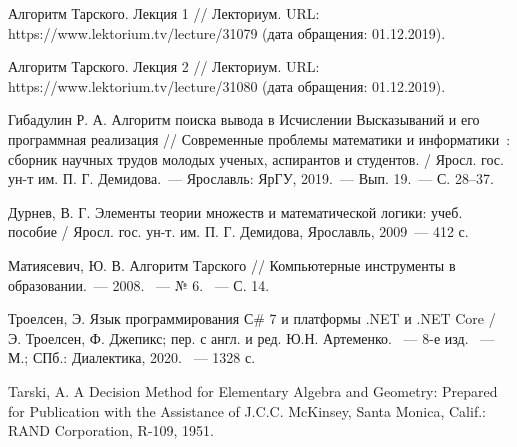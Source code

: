 \begin{thebibliography}{99}
    Алгоритм Тарского. Лекция 1 // Лекториум. URL: https://www.lektorium.tv/lecture/31079 (дата обращения: 01.12.2019).

    Алгоритм Тарского. Лекция 2 // Лекториум. URL: https://www.lektorium.tv/lecture/31080 (дата обращения: 01.12.2019).

    Гибадулин Р. А. Алгоритм поиска вывода в Исчислении Высказываний и его программная реализация // Современные проблемы математики и информатики~: сборник научных трудов молодых ученых, аспирантов и студентов. / Яросл. гос. ун-т им. П. Г. Демидова.~--- Ярославль: ЯрГУ, 2019.~--- Вып. 19.~--- С. 28--37.

    Дурнев, В. Г. Элементы теории множеств и математической логики: учеб. пособие / Яросл. гос. ун-т. им. П. Г. Демидова, Ярославль, 2009~--- 412 с.

    Матиясевич, Ю. В. Алгоритм Тарского // Компьютерные инструменты в образовании.~--- 2008. ~--- № 6. ~--- С. 14.

    Троелсен, Э. Язык программирования С\# 7 и платформы .NET и .NET Core / Э. Троелсен, Ф. Джепикс; пер. с англ. и ред. Ю.Н. Артеменко. ~--- 8-е изд. ~--- М.; СПб.: Диалектика, 2020. ~--- 1328 с.

    Tarski, A. A Decision Method for Elementary Algebra and Geometry: Prepared for Publication with the Assistance of J.C.C. McKinsey, Santa Monica, Calif.: RAND Corporation, R-109, 1951. 

\end{thebibliography}

